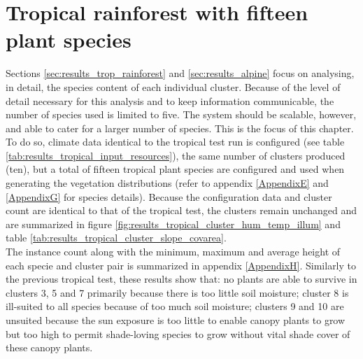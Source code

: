 \section{Tropical rainforest with fifteen plant species} \label{sec:results_trop_rainforest_big}

Sections \ref{sec:results_trop_rainforest} and \ref{sec:results_alpine} focus on analysing, in detail, the species content of each individual cluster. Because of the level of detail necessary for this analysis and to keep information communicable, the number of species used is limited to five. The system should be scalable, however, and able to cater for a larger number of species. This is the focus of this chapter. To do so, climate data identical to the tropical test run is configured (see table \ref{tab:results_tropical_input_resources}), the same number of clusters produced (ten), but a total of fifteen tropical plant species are configured and used when generating the vegetation distributions (refer to appendix \ref{AppendixE} and \ref{AppendixG} for species details). Because the configuration data and cluster count are identical to that of the tropical test, the clusters remain unchanged and are summarized in figure \ref{fig:results_tropical_cluster_hum_temp_illum} and table \ref{tab:results_tropical_cluster_slope_covarea}.\\

The instance count along with the minimum, maximum and average height of each specie and cluster pair is summarized in appendix \ref{AppendixH}. Similarly to the previous tropical test, these results show that: no plants are able to survive in clusters 3, 5 and 7 primarily because there is too little soil moisture; cluster 8 is ill-suited to all species because of too much soil moisture; clusters 9 and 10 are unsuited because the sun exposure is too little to enable canopy plants to grow but too high to permit shade-loving species to grow without vital shade cover of these canopy plants.\\

